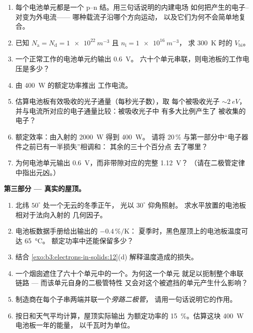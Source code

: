 \begin{problem}
\begin{enumerate}[resume]
  \item 每个电池单元都是一个 p--n 结。用三句话说明的内建电场
        如何把产生的电子–对变为外电流——
        哪种载流子沿哪个方向运动，
        以及它们为何不会简单地复合。
  \item 已知 $N_{\text{a}} = N_{\text{d}} = \qty{1e22}{m^{-3}}$
        且 $n_{\text{i}} = \qty{1e16}{m^{-3}}$，
        求 \qty{300}{K} 时的 $V_{\text{bi}}$。
  \item 一个正常工作的电池单元约输出 \qty{0.6}{V}。
        六十个单元串联，则电池板的工作电压是多少？
  \item 由 \qty{400}{W} 的额定功率推出
        工作电流。
  \item 估算电池板有效吸收的光子通量（每秒光子数），取
        每个被吸收光子 $\sim\qty{2}{eV}$，
        并与电流所对应的电子通量比较：被吸收光子中
        有多大比例产生了
        被收集的电子？
  \item 额定效率：由入射的 \qty{2000}{W} 得到 \qty{400}{W}。
        请将 20\,\% 与第一部分中“电子器件之前已有一半损失”相调和：
        其余的三十个百分点
        去了哪里？
  \item 为何电池单元输出 \qty{0.6}{V}，而非带隙对应的完整
        \qty{1.12}{V}？
        （请在二极管定律中指出元凶。）
\end{enumerate}

\medskip\noindent\textbf{第三部分 --- 真实的屋顶。}

\begin{enumerate}[resume]
  \item 北纬 $50^\circ$ 处一个无云的冬季正午，
        光以 $30^\circ$ 仰角照射。
        求水平放置的电池板相对于法向入射的
        几何因子。
  \item 电池板数据手册给出输出的 $-0.4\,\%/\text{K}$：
        夏季时，黑色屋顶上的电池板温度可达 \qty{65}{\celsius}。
        额定功率中还能保留多少？
  \item 结合
        \cref{exo:b3:electrons-in-solids:12}(d) 解释温度造成的损失。
  \item 一个烟囱遮住了六十个单元中的一个。为何这一个单元
        就足以扼制整个串联链路 --- 而该单元自身的二极管特性
        又会对这个被遮挡的单元产生什么影响？
  \item 制造商在每个子串两端并联一个\emph{旁路二极管}，
        请用一句话说明它的作用。
  \item 按日和天气平均计算，屋顶实际输出
        为额定功率的 \qty{15}{\percent}。估算这块 \qty{400}{W} 电池板一年的能量，
        以千瓦时为单位。
\end{enumerate}


\end{problem}
